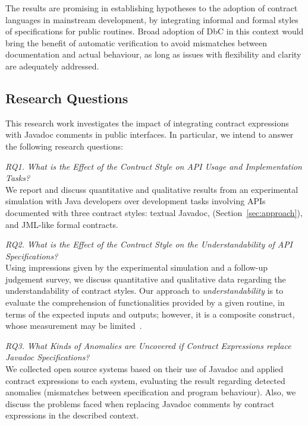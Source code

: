 The results are promising in establishing hypotheses to the adoption of contract languages in mainstream development, by integrating informal and formal styles of specifications for public routines.
Broad adoption of DbC in this context would bring the benefit of automatic verification to avoid mismatches between documentation and actual behaviour, as long as issues with flexibility and clarity are adequately addressed. 


\subsection{Research Questions}
\label{sec:researchQuestions}

This research work investigates the impact of integrating contract expressions with Javadoc comments in public interfaces. 
In particular, we intend to answer the following research questions:  

\noindent\emph{RQ1. What is the Effect of the Contract Style on API Usage and Implementation Tasks?}\\
We report and discuss quantitative and qualitative results from an experimental simulation with Java developers over development tasks involving APIs documented with three contract styles: textual Javadoc, \contractjdoc{} (Section~\ref{sec:approach}), and JML-like formal contracts. 

\noindent\emph{RQ2. What is the Effect of the Contract Style on the Understandability of API Specifications?}\\
Using impressions given by the experimental simulation and a follow-up judgement survey, we discuss quantitative and qualitative data regarding the understandability of contract styles. 
Our approach to \emph{understandability} is to evaluate the comprehension of functionalities provided by a given routine, in terms of the expected inputs and outputs; however, it is a composite construct, whose measurement may be limited~\cite{4019969,Scalabrino2017}.


\noindent\emph{RQ3. What Kinds of Anomalies are Uncovered if Contract Expressions replace Javadoc Specifications?}\\
We collected open source systems based on their use of Javadoc and applied contract expressions
to each system, evaluating the result regarding detected anomalies (mismatches between specification and program behaviour). Also, we discuss the problems faced when replacing Javadoc comments by contract expressions in the described context.
